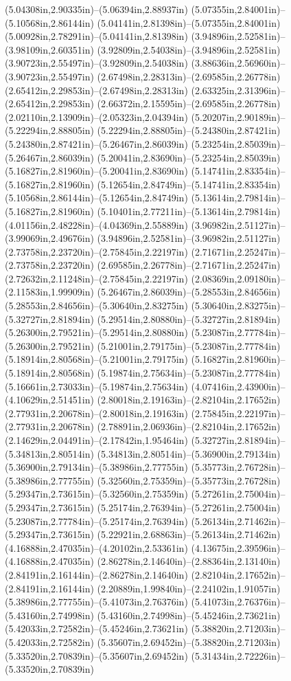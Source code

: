 (5.04308in,2.90335in)--(5.06394in,2.88937in) (5.07355in,2.84001in)--(5.10568in,2.86144in) (5.04141in,2.81398in)--(5.07355in,2.84001in) (5.00928in,2.78291in)--(5.04141in,2.81398in) (3.94896in,2.52581in)--(3.98109in,2.60351in) (3.92809in,2.54038in)--(3.94896in,2.52581in) (3.90723in,2.55497in)--(3.92809in,2.54038in) (3.88636in,2.56960in)--(3.90723in,2.55497in) (2.67498in,2.28313in)--(2.69585in,2.26778in) (2.65412in,2.29853in)--(2.67498in,2.28313in) (2.63325in,2.31396in)--(2.65412in,2.29853in) (2.66372in,2.15595in)--(2.69585in,2.26778in) (2.02110in,2.13909in)--(2.05323in,2.04394in) (5.20207in,2.90189in)--(5.22294in,2.88805in) (5.22294in,2.88805in)--(5.24380in,2.87421in) (5.24380in,2.87421in)--(5.26467in,2.86039in) (5.23254in,2.85039in)--(5.26467in,2.86039in) (5.20041in,2.83690in)--(5.23254in,2.85039in) (5.16827in,2.81960in)--(5.20041in,2.83690in) (5.14741in,2.83354in)--(5.16827in,2.81960in) (5.12654in,2.84749in)--(5.14741in,2.83354in) (5.10568in,2.86144in)--(5.12654in,2.84749in) (5.13614in,2.79814in)--(5.16827in,2.81960in) (5.10401in,2.77211in)--(5.13614in,2.79814in) (4.01156in,2.48228in)--(4.04369in,2.55889in) (3.96982in,2.51127in)--(3.99069in,2.49676in) (3.94896in,2.52581in)--(3.96982in,2.51127in) (2.73758in,2.23720in)--(2.75845in,2.22197in) (2.71671in,2.25247in)--(2.73758in,2.23720in) (2.69585in,2.26778in)--(2.71671in,2.25247in) (2.72632in,2.11248in)--(2.75845in,2.22197in) (2.08369in,2.09180in)--(2.11583in,1.99909in) (5.26467in,2.86039in)--(5.28553in,2.84656in) (5.28553in,2.84656in)--(5.30640in,2.83275in) (5.30640in,2.83275in)--(5.32727in,2.81894in) (5.29514in,2.80880in)--(5.32727in,2.81894in) (5.26300in,2.79521in)--(5.29514in,2.80880in) (5.23087in,2.77784in)--(5.26300in,2.79521in) (5.21001in,2.79175in)--(5.23087in,2.77784in) (5.18914in,2.80568in)--(5.21001in,2.79175in) (5.16827in,2.81960in)--(5.18914in,2.80568in) (5.19874in,2.75634in)--(5.23087in,2.77784in) (5.16661in,2.73033in)--(5.19874in,2.75634in) (4.07416in,2.43900in)--(4.10629in,2.51451in) (2.80018in,2.19163in)--(2.82104in,2.17652in) (2.77931in,2.20678in)--(2.80018in,2.19163in) (2.75845in,2.22197in)--(2.77931in,2.20678in) (2.78891in,2.06936in)--(2.82104in,2.17652in) (2.14629in,2.04491in)--(2.17842in,1.95464in) (5.32727in,2.81894in)--(5.34813in,2.80514in) (5.34813in,2.80514in)--(5.36900in,2.79134in) (5.36900in,2.79134in)--(5.38986in,2.77755in) (5.35773in,2.76728in)--(5.38986in,2.77755in) (5.32560in,2.75359in)--(5.35773in,2.76728in) (5.29347in,2.73615in)--(5.32560in,2.75359in) (5.27261in,2.75004in)--(5.29347in,2.73615in) (5.25174in,2.76394in)--(5.27261in,2.75004in) (5.23087in,2.77784in)--(5.25174in,2.76394in) (5.26134in,2.71462in)--(5.29347in,2.73615in) (5.22921in,2.68863in)--(5.26134in,2.71462in) (4.16888in,2.47035in)--(4.20102in,2.53361in) (4.13675in,2.39596in)--(4.16888in,2.47035in) (2.86278in,2.14640in)--(2.88364in,2.13140in) (2.84191in,2.16144in)--(2.86278in,2.14640in) (2.82104in,2.17652in)--(2.84191in,2.16144in) (2.20889in,1.99840in)--(2.24102in,1.91057in) (5.38986in,2.77755in)--(5.41073in,2.76376in) (5.41073in,2.76376in)--(5.43160in,2.74998in) (5.43160in,2.74998in)--(5.45246in,2.73621in) (5.42033in,2.72582in)--(5.45246in,2.73621in) (5.38820in,2.71203in)--(5.42033in,2.72582in) (5.35607in,2.69452in)--(5.38820in,2.71203in) (5.33520in,2.70839in)--(5.35607in,2.69452in) (5.31434in,2.72226in)--(5.33520in,2.70839in) 